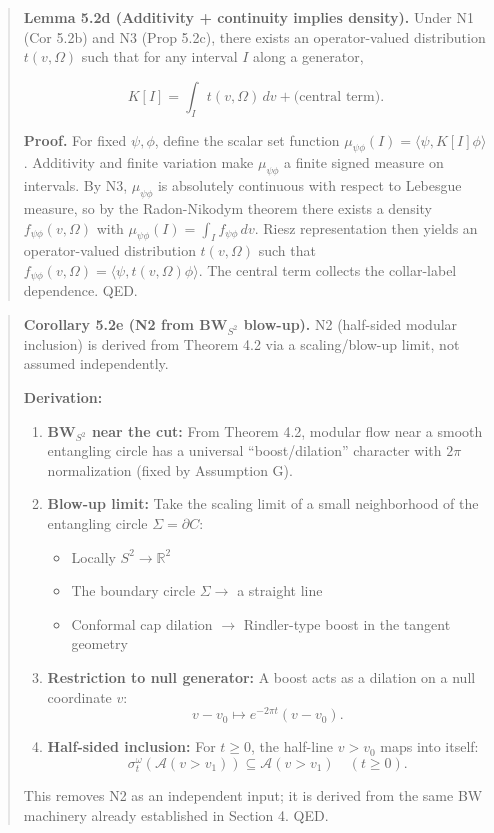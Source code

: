 \documentclass[11pt,a4paper]{article}
\theoremstyle{remark}
\providecommand{\tightlist}{%
  \setlength{\itemsep}{0pt}\setlength{\parskip}{0pt}}
\begin{document}
\begin{quote}
\textbf{Lemma 5.2d (Additivity + continuity implies density).} Under N1 (Cor
5.2b) and N3 (Prop 5.2c), there exists an operator-valued distribution
\(t(v,\Omega)\) such that for any interval \(I\) along a generator,

\[
K[I] = \int_I t(v,\Omega)\,dv + \text{(central term)}.
\]

\textbf{Proof.} For fixed \(\psi,\phi\), define the scalar set function
\(\mu_{\psi\phi}(I) = \langle \psi, K[I] \phi \rangle\). Additivity and finite
variation make \(\mu_{\psi\phi}\) a finite signed measure on intervals. By
N3, \(\mu_{\psi\phi}\) is absolutely continuous with respect to Lebesgue
measure, so by the Radon-Nikodym theorem there exists a density
\(f_{\psi\phi}(v,\Omega)\) with \(\mu_{\psi\phi}(I)=\int_I f_{\psi\phi}\,dv\).
Riesz representation then yields an operator-valued distribution
\(t(v,\Omega)\) such that \(f_{\psi\phi}(v,\Omega)=\langle \psi, t(v,\Omega)
\phi \rangle\). The central term collects the collar-label dependence. QED.
\end{quote}

\begin{quote}
\textbf{Corollary 5.2e (N2 from BW\(_{S^2}\) blow-up).} N2 (half-sided modular
inclusion) is derived from Theorem 4.2 via a scaling/blow-up limit, not
assumed independently.

\textbf{Derivation:}

\begin{enumerate}
\def\labelenumi{\arabic{enumi}.}
\item
  \textbf{BW\(_{S^2}\) near the cut:} From Theorem 4.2, modular flow near a smooth
  entangling circle has a universal ``boost/dilation'' character with \(2\pi\)
  normalization (fixed by Assumption G).
\item
  \textbf{Blow-up limit:} Take the scaling limit of a small neighborhood of the
  entangling circle \(\Sigma = \partial C\):

  \begin{itemize}
  \tightlist
  \item
    Locally \(S^2 \to \mathbb{R}^2\)
  \item
    The boundary circle \(\Sigma \to\) a straight line
  \item
    Conformal cap dilation \(\to\) Rindler-type boost in the tangent geometry
  \end{itemize}
\item
  \textbf{Restriction to null generator:} A boost acts as a dilation on a null
  coordinate \(v\):
  \[
  v - v_0 \mapsto e^{-2\pi t}(v - v_0).
  \]
\item
  \textbf{Half-sided inclusion:} For \(t \ge 0\), the half-line \(v > v_0\) maps into
  itself:
  \[
  \sigma_t^{\omega}(\mathcal{A}(v > v_1)) \subseteq \mathcal{A}(v > v_1)
  \quad (t \ge 0).
  \]
\end{enumerate}

This removes N2 as an independent input; it is derived from the same BW
machinery already established in Section 4. QED.
\end{quote}
\end{document}
